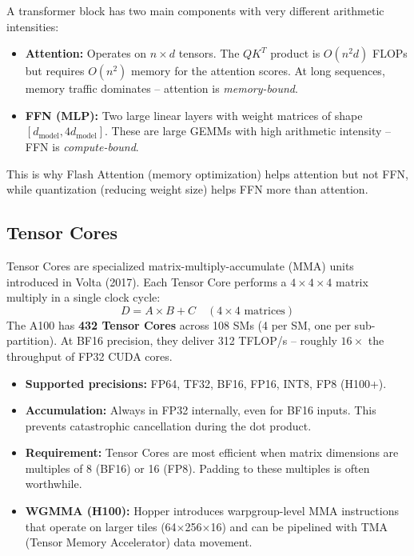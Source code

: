 \begin{intuitionbox}
A transformer block has two main components with very different arithmetic intensities:

\begin{itemize}
  \item \textbf{Attention:} Operates on $n \times d$ tensors. The $QK^T$ product is $O(n^2 d)$ FLOPs but requires $O(n^2)$ memory for the attention scores. At long sequences, memory traffic dominates -- attention is \emph{memory-bound}.
  \item \textbf{FFN (MLP):} Two large linear layers with weight matrices of shape $[d_{\text{model}}, 4d_{\text{model}}]$. These are large GEMMs with high arithmetic intensity -- FFN is \emph{compute-bound}.
\end{itemize}

This is why Flash Attention (memory optimization) helps attention but not FFN, while quantization (reducing weight size) helps FFN more than attention.
\end{intuitionbox}

\subsection{Tensor Cores}
\label{tensor-cores}

\begin{keybox}
Tensor Cores are specialized matrix-multiply-accumulate (MMA) units introduced in Volta (2017). Each Tensor Core performs a $4\times4\times4$ matrix multiply in a single clock cycle: 
\[
D = A \times B + C \quad (4\times4 \text{ matrices})
\]
 The A100 has \textbf{432 Tensor Cores} across 108 SMs (4 per SM, one per sub-partition). At BF16 precision, they deliver 312 TFLOP/s -- roughly $16\times$ the throughput of FP32 CUDA cores.
\end{keybox}

\begin{itemize}
  \item \textbf{Supported precisions:} FP64, TF32, BF16, FP16, INT8, FP8 (H100+).
  \item \textbf{Accumulation:} Always in FP32 internally, even for BF16 inputs. This prevents catastrophic cancellation during the dot product.
  \item \textbf{Requirement:} Tensor Cores are most efficient when matrix dimensions are multiples of 8 (BF16) or 16 (FP8). Padding to these multiples is often worthwhile.
  \item \textbf{WGMMA (H100):} Hopper introduces warpgroup-level MMA instructions that operate on larger tiles (64$\times$256$\times$16) and can be pipelined with TMA (Tensor Memory Accelerator) data movement.
\end{itemize}

